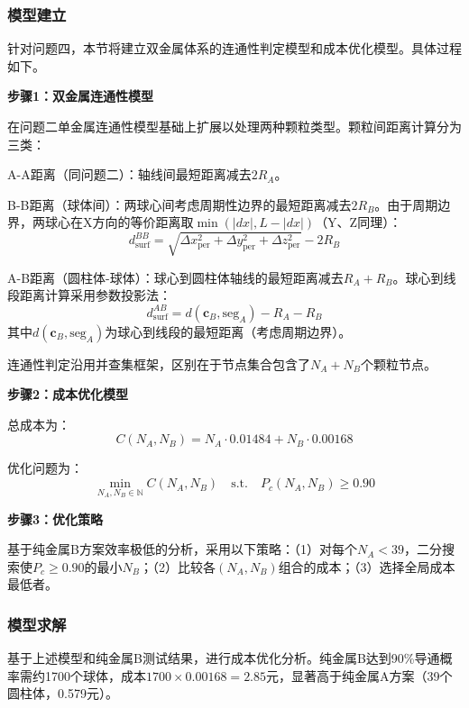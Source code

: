 
\subsubsection{模型建立}

针对问题四，本节将建立双金属体系的连通性判定模型和成本优化模型。具体过程如下。

\textbf{步骤1：双金属连通性模型}

在问题二单金属连通性模型基础上扩展以处理两种颗粒类型。颗粒间距离计算分为三类：

A-A距离（同问题二）：轴线间最短距离减去$2R_A$。

B-B距离（球体间）：两球心间考虑周期性边界的最短距离减去$2R_B$。由于周期边界，两球心在X方向的等价距离取$\min(|dx|, L - |dx|)$（Y、Z同理）：
\begin{equation}
d_{\text{surf}}^{BB} = \sqrt{\Delta x_{\text{per}}^2 + \Delta y_{\text{per}}^2 + \Delta z_{\text{per}}^2} - 2R_B
\end{equation}

A-B距离（圆柱体-球体）：球心到圆柱体轴线的最短距离减去$R_A + R_B$。球心到线段距离计算采用参数投影法：
\begin{equation}
d_{\text{surf}}^{AB} = d(\mathbf{c}_B, \text{seg}_A) - R_A - R_B
\end{equation}
其中$d(\mathbf{c}_B, \text{seg}_A)$为球心到线段的最短距离（考虑周期边界）。

连通性判定沿用并查集框架，区别在于节点集合包含了$N_A + N_B$个颗粒节点。

\textbf{步骤2：成本优化模型}

总成本为：
\begin{equation}
C(N_A, N_B) = N_A \cdot 0.01484 + N_B \cdot 0.00168
\end{equation}

优化问题为：
\begin{equation}
\min_{N_A, N_B \in \mathbb{N}} C(N_A, N_B) \quad \text{s.t.} \quad P_c(N_A, N_B) \geq 0.90
\end{equation}

\textbf{步骤3：优化策略}

基于纯金属B方案效率极低的分析，采用以下策略：（1）对每个$N_A < 39$，二分搜索使$P_c \geq 0.90$的最小$N_B$；（2）比较各$(N_A, N_B)$组合的成本；（3）选择全局成本最低者。

\subsubsection{模型求解}

基于上述模型和纯金属B测试结果，进行成本优化分析。纯金属B达到90\%导通概率需约1700个球体，成本$1700 \times 0.00168 = 2.85$元，显著高于纯金属A方案（39个圆柱体，0.579元）。

